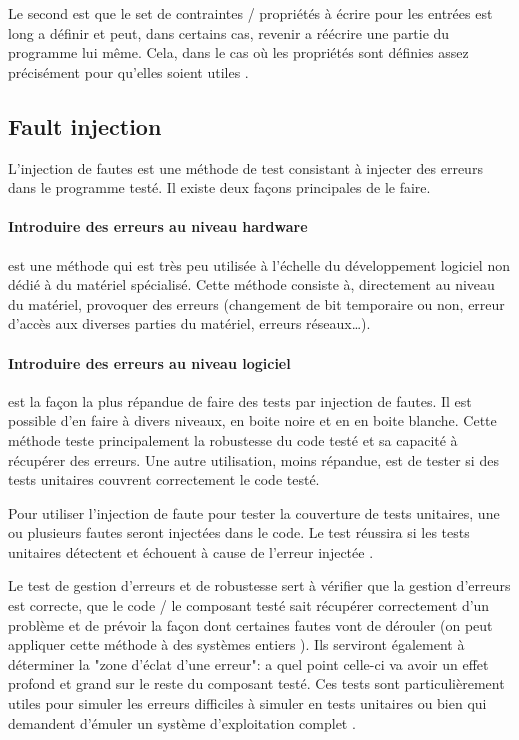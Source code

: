 \documentclass[a4paper]{report}
\begin{document}
Le second est que le set de contraintes / propriétés à écrire pour les entrées est long a définir et peut, dans certains cas, revenir  a réécrire une partie du programme lui même.
Cela, dans le cas où les propriétés sont définies assez précisément pour qu'elles soient utiles \cite{Papadakis2011}.

\subsection{Fault injection}

L'injection de fautes est une méthode de test consistant à injecter des erreurs dans le programme testé.
Il existe deux façons principales de le faire.


\paragraph{Introduire des erreurs au niveau hardware} est une méthode qui est très peu utilisée à l'échelle du développement logiciel non dédié à du matériel spécialisé.
Cette méthode consiste à, directement au niveau du matériel, provoquer des erreurs (changement de bit temporaire ou non, erreur d'accès aux diverses parties du matériel, erreurs réseaux…)\cite{Avresky1996}.

\paragraph{Introduire des erreurs au niveau logiciel} est la façon la plus répandue de faire des tests par injection de fautes.
Il est possible d'en faire à divers niveaux, en boite noire et en en boite blanche.
Cette méthode teste principalement la robustesse du code testé et sa capacité à récupérer des erreurs.
Une autre utilisation, moins répandue, est de tester si des tests unitaires couvrent correctement le code testé.

Pour utiliser l'injection de faute pour tester la couverture de tests unitaires, une ou plusieurs fautes seront injectées dans le code.
Le test réussira si les tests unitaires détectent et échouent à cause de l'erreur injectée \cite{Segall}.

Le test de gestion d'erreurs et de robustesse sert à vérifier que la gestion d'erreurs est correcte, que le code / le composant testé sait récupérer correctement d'un problème et de prévoir la façon dont certaines fautes vont de dérouler \cite{Avresky1996} (on peut appliquer cette méthode à des systèmes entiers \cite{Lenka2018}).
Ils serviront également à déterminer la "zone d'éclat d'une erreur": a quel point celle-ci va avoir un effet profond et grand sur le reste du composant testé.
Ces tests sont particulièrement utiles pour simuler les erreurs difficiles à simuler en tests unitaires ou bien qui demandent d'émuler un système d'exploitation complet \cite{Marinescu2011}.
\end{document}
